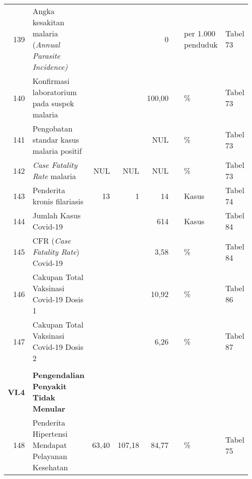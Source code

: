 \begin{small}
\begin{longtable}{rY{12em}rrrrY{5em}Y{5em}}
	139 & Angka kesakitan malaria (\emph{Annual Parasite Incidence)}                  &        &        &                  0 &          & per 1.000 penduduk             & Tabel 73 \\
	140 & Konfirmasi laboratorium pada suspek malaria                                 &        &        &             100,00 &          & \%                             & Tabel 73 \\
	141 & Pengobatan standar kasus malaria positif                                    &        &        &                NUL &          & \%                             & Tabel 73 \\
	142 & \emph{Case Fatality Rate} malaria                                           &    NUL &    NUL &                NUL &          & \%                             & Tabel 73 \\
	143 & Penderita kronis filariasis                                                 &     13 &      1 &                 14 &          & Kasus                          & Tabel 74 \\
	144 & Jumlah Kasus Covid-19                                                       &        &        &                614 &          & Kasus                          & Tabel 84 \\
	145 & CFR (\emph{Case Fatality Rate}) Covid-19                                    &        &        &               3,58 &          & \%                             & Tabel 84 \\
	146 & Cakupan Total Vaksinasi Covid-19 Dosis 1                                    &        &        &              10,92 &          & \%                             & Tabel 86 \\
	147 & Cakupan Total Vaksinasi Covid-19 Dosis 2                                    &        &        &               6,26 &          & \%                             & Tabel 87 \\
	&                                                                                 &        &        &                    &          &                                &          \\
	\textbf{VI.4} & \textbf{Pengendalian Penyakit Tidak Menular}                      &        &        &                    &          &                                &          \\
	148 & Penderita Hipertensi Mendapat Pelayanan Kesehatan                           &  63,40 & 107,18 &              84,77 &          & \%                             & Tabel 75 \\

\end{longtable}
\end{small}
